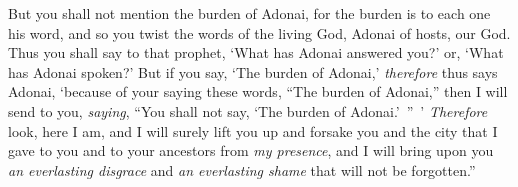 \begin{biblechapter}
\verse But you shall not mention the burden of Adonai, for the burden is to each one his word, and so you twist the words of the living God, Adonai of hosts, our God.
\verse Thus you shall say to that prophet, ‘What has Adonai answered you?’ or, ‘What has Adonai spoken?’
\verse But if you say, ‘The burden of Adonai,’ \textit{therefore} thus says Adonai, ‘because of your saying these words, “The burden of Adonai,” then I will send to you, \textit{saying}, “You shall not say, ‘The burden of Adonai.’ ” ’
\verse \textit{Therefore} look, here I am, and I will surely lift you up and forsake you and the city that I gave to you and to your ancestors from \textit{my presence},
\verse and I will bring upon you \textit{an everlasting disgrace} and \textit{an everlasting shame} that will not be forgotten.”
\end{biblechapter}

